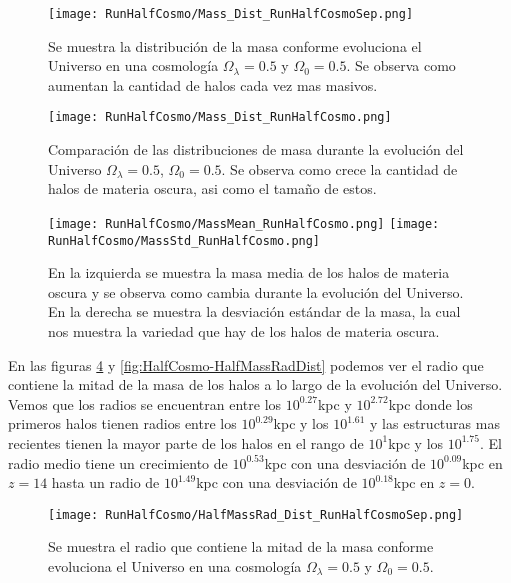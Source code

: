 \begin{figure}[H]
    \centering
    \texttt{[image: RunHalfCosmo/Mass\_Dist\_RunHalfCosmoSep.png]}
    \caption[Distribución de masa]{\footnotesize Se muestra la distribución de la masa conforme evoluciona el Universo en una cosmología $\Omega_\lambda = 0.5$ y $\Omega_0 = 0.5$. Se observa como aumentan la cantidad de halos cada vez mas masivos.}
    \label{fig:HalfCosmo-MassDistSep}
\end{figure}

\begin{figure}[H]
    \centering
    \texttt{[image: RunHalfCosmo/Mass\_Dist\_RunHalfCosmo.png]}
    \caption[Comparación de distribución de masa Universo]{\footnotesize Comparación de las distribuciones de masa durante la evolución del Universo $\Omega_\lambda = 0.5$, $\Omega_0 = 0.5$. Se observa como crece la cantidad de halos de materia oscura, asi como el tamaño de estos.}
    \label{fig:HalfCosmo-MassDist}
\end{figure}

\begin{figure}[H]
    \centering
    \texttt{[image: RunHalfCosmo/MassMean\_RunHalfCosmo.png]}
    \texttt{[image: RunHalfCosmo/MassStd\_RunHalfCosmo.png]}
    \caption[Media y desviación estándar de la distribución de masa]{\footnotesize En la izquierda se muestra la masa media de los halos de materia oscura y se observa como cambia durante la evolución del Universo. En la derecha se muestra la desviación estándar de la masa, la cual nos muestra la variedad que hay de los halos de materia oscura.}
    \label{fig:HalfCosmo-MassStats}
\end{figure}

En las figuras \ref{fig:HalfCosmo-HalfMassRadDistSep} y \ref{fig:HalfCosmo-HalfMassRadDist} podemos ver el radio que contiene la mitad de la masa de los halos a lo largo de la evolución del Universo. Vemos que los radios se encuentran entre los $10^{0.27}$kpc y $10^{2.72}$kpc donde los primeros halos tienen radios entre los $10^{0.29}$kpc y los $10^{1.61}$ y las estructuras mas recientes tienen la mayor parte de los halos en el rango de $10^{1}$kpc y los $10^{1.75}$. El radio medio tiene un crecimiento de $10^{0.53}$kpc con una desviación de $10^{0.09}$kpc en $z=14$ hasta un radio de $10^{1.49}$kpc con una desviación de $10^{0.18}$kpc en $z=0$.

\begin{figure}[H]
    \centering
    \texttt{[image: RunHalfCosmo/HalfMassRad\_Dist\_RunHalfCosmoSep.png]}
    \caption[Radio que contiene la mitad de la masa]{\footnotesize Se muestra el radio que contiene la mitad de la masa conforme evoluciona el Universo en una cosmología $\Omega_\lambda = 0.5 $ y $\Omega_0 = 0.5$.}
    \label{fig:HalfCosmo-HalfMassRadDistSep}
\end{figure}

